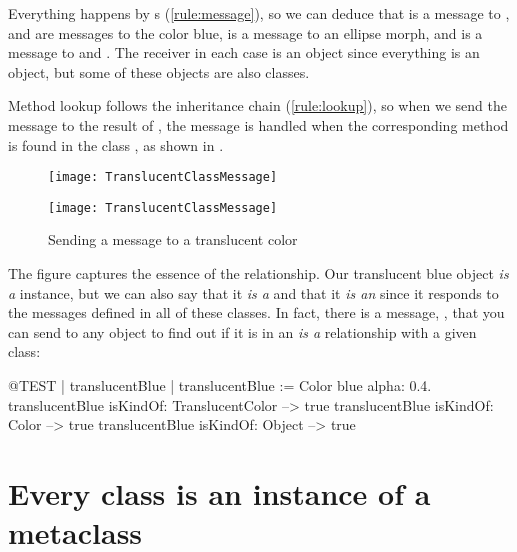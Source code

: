 \documentclass[a4paper,10pt,twoside]{book}
\begin{document}
Everything happens by s (\ref{rule:message}), so we can deduce that  is a message to ,  and  are messages to the color blue,  is a message to an ellipse morph, and  is a message to  and .
The receiver in each case is an object since everything is an object, but some of these objects are also classes.

Method lookup follows the inheritance chain (\ref{rule:lookup}), so when we send the message  to the result of , the message is handled when the corresponding method is found in the class , as shown in .

\begin{center}
\begin{figure}[!ht]
\ifluluelse
	{\centerline{\texttt{[image: TranslucentClassMessage]}}}
	{\centerline{\texttt{[image: TranslucentClassMessage]}}}
\caption{Sending a message to a translucent color\label{fig:classmessage}}
\end{figure}
\end{center}

The figure captures the essence of the  relationship.
Our translucent blue object \emph{is a}  instance, but we can also say that it \emph{is a}  and that it \emph{is an}  since it responds to the messages defined in all of these classes.
In fact, there is a message, , that you can send to any object to find out if it is in an \emph{is a} relationship with a given class:
\begin{code}{@TEST | translucentBlue |}
translucentBlue := Color blue alpha: 0.4.
translucentBlue isKindOf: TranslucentColor --> true
translucentBlue isKindOf: Color                    --> true
translucentBlue isKindOf: Object                  --> true
\end{code}

\section{Every class is an instance of a metaclass}

\end{document}
